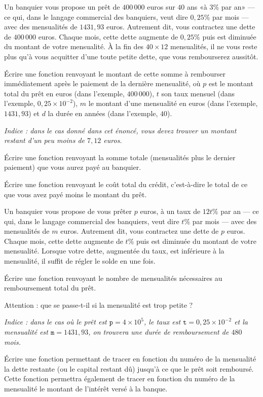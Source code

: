 Un banquier vous  propose un prêt de $400\,000$ euros  sur $40$ ans «à
$3\%$ par  an» ---  ce qui, dans  le langage commercial  des banquiers,
veut  dire $0,25\%$  par mois  ---  avec des  mensualités de  $1431,93$
euros.  Autrement  dit,  vous   contractez  une  dette  de  $400\,000$
euros. Chaque mois, cette dette  augmente de $0,25\%$ puis est diminuée
du  montant  de  votre  mensualité.  À  la  fin  des  $40  \times  12$
mensualités, il  ne vous  reste plus qu'à  vous acquitter  d'une toute
petite dette, que vous rembourserez aussitôt.


\question{} Écrire  une fonction  
renvoyant  le montant  de cette  somme à  rembourser  immédiatement
après le paiement de la dernière
mensualité, où  $p$ est le  montant total du  prêt en euros (dans l'exemple, $400\,000$), $t$ son  taux mensuel (dans l'exemple, 
$0,25 \times 10^{-2}$), $m$ le montant d'une mensualité en euros (dans l'exemple, $1431,93$) et $d$ la
durée en années (dans l'exemple, $40$).

\emph{Indice : dans le cas donné dans cet énoncé, vous devez trouver un montant
restant d'un peu moins de $7,12$ euros.}


\question{} Écrire une fonction  renvoyant la somme totale (mensualités plus le dernier
paiement) que vous aurez payé au banquier.


\question{}Écrire une fonction  renvoyant
  le coût total  du crédit, c'est-à-dire le total de  ce que vous avez
  payé moins le montant du prêt.
  
Un banquier vous propose de vous prêter $p$ euros, à un taux de $12t\%$ par an ---  ce qui, dans  le langage commercial  des banquiers,
veut  dire $t\%$  par mois  --- avec des  mensualités de  $m$ euros. Autrement  dit,  vous   contractez  une  dette  de  $p$
euros. Chaque mois, cette dette  augmente de $t\%$ puis est diminuée du  montant  de  votre  mensualité. Lorsque votre dette, augmentée du taux, est inférieure à la mensualité, il suffit de régler le solde en une fois.

\question{} \'Ecrire une fonction  renvoyant le nombre de mensualités nécessaires au remboursement total du prêt.

\question{} Attention : que se passe-t-il si la mensualité est trop petite ? 

\emph{Indice : dans le cas où le prêt est $\texttt{p}=4\times10^5$, le taux est $\texttt{t}=0,25\times10^{-2}$ et la mensualité est $\texttt{m}=1431,93$, on trouvera une durée de remboursement de $480$ mois.}

\question{} \'Ecrire une fonction  permettant de tracer en fonction du numéro de la mensualité la dette restante (ou le capital restant dû) jusqu'à ce que le prêt soit remboursé. Cette fonction permettra également de tracer en fonction du numéro de la mensualité le montant de l'intérêt versé à la banque. 
